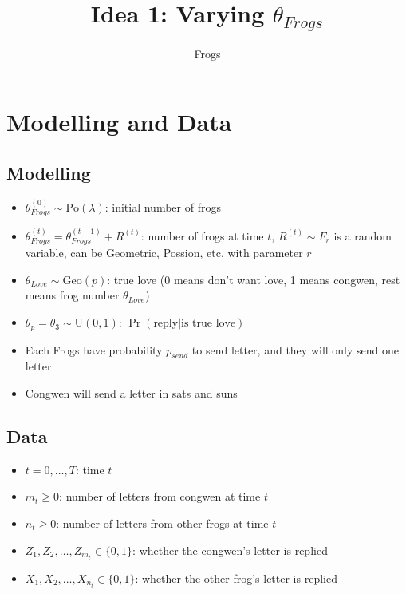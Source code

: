 \documentclass[10pt, a4paper]{article}
\title{Idea 1: Varying $\theta_{Frogs}$}
\author{Frogs}
\begin{document}
    \maketitle

    \section{Modelling and Data}

    \subsection{Modelling}
    \begin{itemize}
        \item $\theta_{Frogs}^{(0)} \sim \mathrm{Po}(\lambda)$: initial number of frogs
        \item $\theta_{Frogs}^{(t)} = \theta_{Frogs}^{(t-1)} + R^{(t)}$: number of frogs at time $t$, $R^{(t)} \sim F_{r}$ is a random variable, can be Geometric, Possion, etc, with parameter $r$
        \item $\theta_{Love} \sim \mathrm{Geo}(p)$: true love (0 means don't want love, 1 means congwen, rest means frog number $\theta_{Love}$)
        \item $\theta_p = \theta_3 \sim \mathrm{U}(0,1)$: $\Pr(\text{reply}|\text{is true love})$
        \item Each Frogs have probability $p_{send}$ to send letter, and they will only send one letter
        \item Congwen will send a letter in sats and suns
    \end{itemize}

    \subsection{Data}
    \begin{itemize}
        \item $t = 0, \ldots, T$: time $t$
        \item $m_t \geq 0$: number of letters from congwen at time $t$
        \item $n_t \geq 0$: number of letters from other frogs at time $t$
        \item $Z_1, Z_2, \ldots, Z_{m_t} \in \{0,1\}$: whether the congwen's letter is replied 
        \item $X_1, X_2, \ldots, X_{n_t} \in \{0,1\}$: whether the other frog's letter is replied
    \end{itemize}
\end{document}

